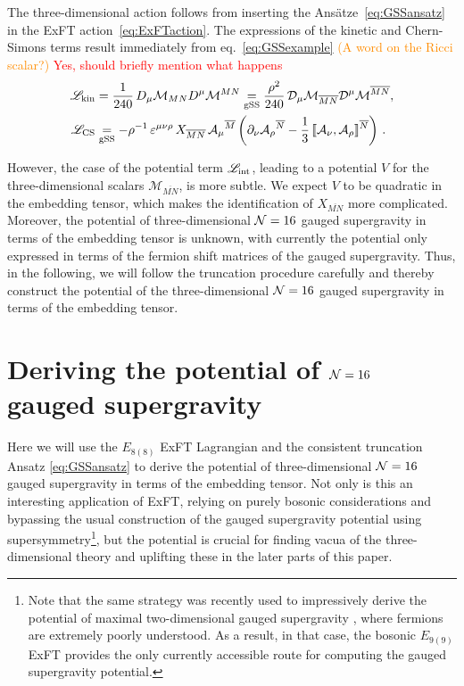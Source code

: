 \documentclass[a4paper, 11pt]{article}
\numberwithin{equation}{section}
\newcommand{\ov}[1]{\overline{#1}}
\newcommand{\EE}{\ensuremath{E_{8(8)}}\xspace}
\newcommand{\En}[1]{E_{#1(#1)}}
\newcommand{\+}{\oplus}
\newcommand{\fl}[1]{\ov{#1}}
\newcommand{\M}{\ensuremath{\mathcal{M}}\xspace}
\newcommand{\A}{\ensuremath{\mathcal{A}}\xspace}
\newcommand{\EM}[1]{\textcolor{red}{#1}}
\newcommand{\CE}[1]{\textcolor{darkorange}{#1}}
\begin{document}
The three-dimensional action follows from inserting the Ansätze~\eqref{eq:GSSansatz} in the ExFT action~\eqref{eq:ExFTaction}. The expressions of the kinetic and Chern-Simons terms result immediately from eq.~\eqref{eq:GSSexample} \CE{(A word on the Ricci scalar?)} \EM{Yes, should briefly mention what happens}
\begin{equation}
	\begin{aligned}
		\mathscr{L}_{\rm kin} &= \frac{1}{240}\,D_{\mu}\M_{MN}D^{\mu}\M^{MN} \underset{\rm gSS}{=} \frac{\rho^{2}}{240}\,{\cal D}_{\mu}\M_{\fl{MN}}{\cal D}^{\mu}\M^{\fl{MN}}, \\
		\mathscr{L}_{\rm CS} &\underset{\rm gSS}{=} -\rho^{-1}\,\varepsilon^{\mu\nu\rho}\,X_{\fl{MN}}\,\A_{\mu}{}^{\fl{M}} \left(\partial_{\nu}\A_{\rho}{}^{\fl{N}}-\frac{1}{3}\,\llbracket\A_{\nu},\A_{\rho}\rrbracket^{\fl{N}}\right)\,.
	\end{aligned}
\end{equation}

However, the case of the potential term $\mathscr{L}_{\rm int}$, leading to a potential $V$ for the three-dimensional scalars $\M_{\fl{MN}}$, is more subtle. We expect $V$ to be quadratic in the embedding tensor, which makes the identification of $X_{\fl{MN}}$ more complicated. Moreover, the potential of three-dimensional ${\cal N}=16$ gauged supergravity in terms of the embedding tensor is unknown, with currently the potential only expressed in terms of the fermion shift matrices of the gauged supergravity. Thus, in the following, we will follow the truncation procedure carefully and thereby construct the potential of the three-dimensional ${\cal N}=16$ gauged supergravity in terms of the embedding tensor.

\section{Deriving the potential of ${\cal N}=16$ gauged supergravity} \label{s:Potential}
Here we will use the $\EE$ ExFT Lagrangian and the consistent truncation Ansatz \eqref{eq:GSSansatz} to derive the potential of three-dimensional ${\cal N}=16$ gauged supergravity in terms of the embedding tensor. Not only is this an interesting application of ExFT, relying on purely bosonic considerations and bypassing the usual construction of the gauged supergravity potential using supersymmetry\footnote{Note that the same strategy was recently used to impressively derive the potential of maximal two-dimensional gauged supergravity \cite{Bossard:2022wvi}, where fermions are extremely poorly understood. As a result, in that case, the bosonic $\En{9}$ ExFT \cite{Bossard:2018utw,Bossard:2021jix} provides the only currently accessible route for computing the gauged supergravity potential.}, but the potential is crucial for finding vacua of the three-dimensional theory and uplifting these in the later parts of this paper.
\end{document}

